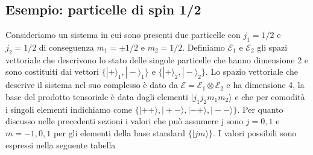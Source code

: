\subsection{Esempio: particelle di spin 1/2}

Consideriamo un sistema in cui sono presenti due particelle con $j_1 = 1/2$ e $j_2 = 1/2 $ di conseguenza $m_1 = \pm 1/2$ e $m_2 = 1/2$. Definiamo $\mathcal{E}_1$ e $\mathcal{E}_2$ gli spazi vettoriale che descrivono lo stato delle singole particelle che hanno dimensione 2 e sono costituiti dai vettori $\{|+\rangle_1 ,|-\rangle_1\}$ e $\{|+\rangle_2 ,|-\rangle_2\}$. Lo spazio vettoriale che descrive il sistema nel suo complesso \`e dato da $\mathcal{E} = \mathcal{E}_1 \otimes \mathcal{E}_2$ e ha dimensione 4, la base del prodotto tensoriale \`e data dagli elementi $|j_1j_2m_1m_2 \rangle $ e che per comodit\` a i singoli elementi indichiamo come $\{|++\rangle,|+-\rangle,|- +\rangle, |--\rangle \}$. Per quanto discusso nelle precedenti sezioni i valori che pu\`o assumere j sono $j=0,1$ e $m = -1,0,1$ per gli elementi della base standard $\{|jm \rangle\}$. I valori possibili sono espressi nella seguente tabella   


